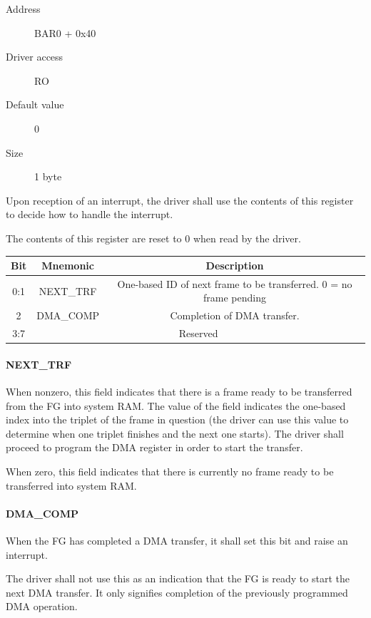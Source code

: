 \documentclass[12pt]{article}
\begin{document}
\begin{description}
\item[Address] BAR0 + 0x40
\item[Driver access] RO
\item[Default value] 0
\item[Size] 1 byte
\end{description}

Upon reception of an interrupt, the driver shall use the contents of this register to decide how to handle the interrupt.

The contents of this register are reset to 0 when read by the driver.

\begin{tabular}{|c|c|c|} \hline
\textbf{Bit} & \textbf{Mnemonic} & \textbf{Description} \\ \hline
0:1 & NEXT\_TRF & One-based ID of next frame to be transferred. 0 = no frame pending \\ \hline
2 & DMA\_COMP & Completion of DMA transfer. \\ \hline
3:7 & \multicolumn{2}{|c|}{Reserved} \\ \hline
\end{tabular}

\paragraph{NEXT\_TRF}

When nonzero, this field indicates that there is a frame ready to be transferred from the FG into system RAM. The value of the field indicates the one-based index into the triplet of the frame in question (the driver can use this value to determine when one triplet finishes and the next one starts). The driver shall proceed to program the DMA register in order to start the transfer.

When zero, this field indicates that there is currently no frame ready to be transferred into system RAM.

\paragraph{DMA\_COMP}

When the FG has completed a DMA transfer, it shall set this bit and raise an interrupt.

The driver shall not use this as an indication that the FG is ready to start the next DMA transfer. It only signifies completion of the previously programmed DMA operation.
\end{document}

